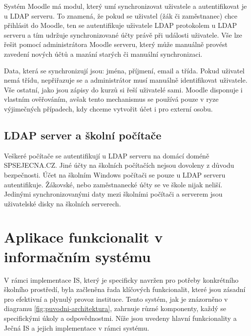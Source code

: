 \documentclass[FM,Proj]{tulthesis}
\begin{document}
Systém Moodle má modul, který umí synchronizovat uživatele a autentifikovat je u LDAP serveru.
To znamená, že pokud se uživatel (žák či zaměstnanec) chce přihlásit do Moodle, ten se 
autentifikuje uživatele LDAP protokolem u LDAP serveru a tím udržuje synchronizované účty právě
při události uživatele.
Vše lze řešit pomocí administrátora Moodle serveru, který může manuálně provést zavedení 
nových účtů a mazání starých či manuální synchronizaci.

Data, která se synchronizují jsou: jména, příjmení, email a třída. Pokud uživatel nemá třídu,
nepřiřazuje se a administrátor musí manuálně identifikovat uživatele. Vše ostatní, jako jsou 
zápisy do kurzů si řeší uživatelé sami. Moodle disponuje i vlastním ověřováním, avšak tento
mechanismus se používá pouze  v ryze výjimečných případech, kdy chceme vytvořit účet i pro 
externí osobu.

\subsection{LDAP server a školní počítače}
\label{section:ldap-server-a-skolni-pocitace}
Veškeré počítače se autentifikují u LDAP serveru na domácí doméně SPSEJECNA.CZ. Jiné účty
na školních počítačích nejsou dovoleny z důvodu bezpečnosti.
Účet na školním Windows počítači se pouze u LDAP serveru autentifikuje. Žákovské, nebo
zaměstnanecké účty se ve škole nijak neliší. Jedinými synchronizovanými daty mezi školními
počítači a serverem jsou uživatelské disky na školních serverech.



\section{Aplikace funkcionalit v informačním systému}
V rámci implementace IS, který je specificky navržen pro potřeby konkrétního školního prostředí,
byla začleněna řada klíčových funkcionalit, které jsou zásadní pro efektivní a plynulý provoz
instituce. Tento systém, jak je znázorněno v diagramu \ref{fig:puvodni-architektura},
zahrnuje různé komponenty, každý se specifickými úkoly a odpovědnostmi. Níže jsou uvedeny
hlavní funkcionality a Ječná IS a jejich implementace v rámci systému.
\end{document}
